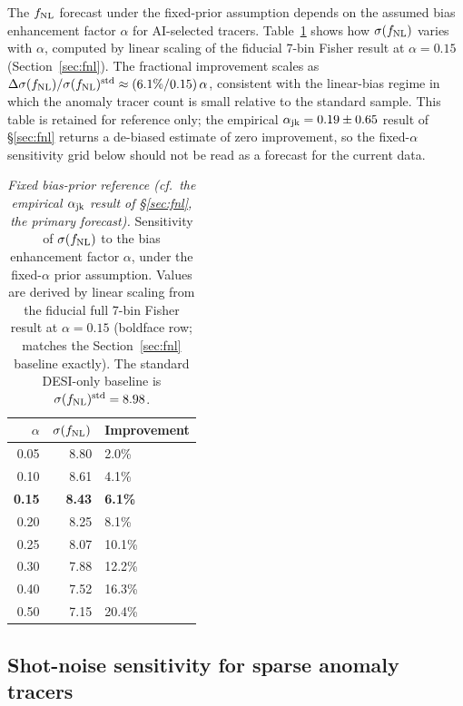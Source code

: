 \documentclass[aps,prd,twocolumn,superscriptaddress,showpacs,preprintnumbers,nofootinbib,longbibliography,floatfix]{revtex4-2}
\newcommand{\fnl}{f_{\rm NL}}
\newcommand{\sigfnl}{\sigma(f_{\rm NL})}
\begin{document}
The $\fnl$ forecast under the fixed-prior assumption depends on the assumed bias enhancement factor $\alpha$ for AI-selected tracers.
Table~\ref{tab:sensitivity} shows how $\sigfnl$ varies with $\alpha$, computed by linear scaling
of the fiducial 7-bin Fisher result at $\alpha = 0.15$ (Section~\ref{sec:fnl}).
The fractional improvement scales as $\Delta\sigfnl / \sigfnl^{\rm std} \approx (6.1\%/0.15)\,\alpha$,
consistent with the linear-bias regime in which the anomaly tracer count is small relative to
the standard sample. This table is retained for reference only; the empirical $\alpha_{\rm jk} = 0.19 \pm 0.65$ result of \S\ref{sec:fnl} returns a de-biased estimate of zero improvement, so the fixed-$\alpha$ sensitivity grid below should not be read as a forecast for the current data.

\begin{table}[tb]
\caption{\label{tab:sensitivity} \textit{Fixed bias-prior reference (cf.\ the empirical $\alpha_{\rm jk}$ result of \S\ref{sec:fnl}, the primary forecast).} Sensitivity of $\sigfnl$ to the bias enhancement factor $\alpha$, under the fixed-$\alpha$ prior assumption.
Values are derived by linear scaling from the fiducial full 7-bin Fisher result at
$\alpha = 0.15$ (boldface row; matches the Section~\ref{sec:fnl} baseline exactly).
The standard DESI-only baseline is $\sigfnl^{\rm std} = 8.98$.}
\begin{ruledtabular}
\begin{tabular}{rrl}
$\alpha$ & $\sigfnl$ & Improvement \\
\hline
0.05 & 8.80 & 2.0\% \\
0.10 & 8.61 & 4.1\% \\
\textbf{0.15} & \textbf{8.43} & \textbf{6.1\%} \\
0.20 & 8.25 & 8.1\% \\
0.25 & 8.07 & 10.1\% \\
0.30 & 7.88 & 12.2\% \\
0.40 & 7.52 & 16.3\% \\
0.50 & 7.15 & 20.4\% \\
\end{tabular}
\end{ruledtabular}
\end{table}

\subsection{Shot-noise sensitivity for sparse anomaly tracers}\label{sec:shotnoise_sensitivity}
\end{document}
